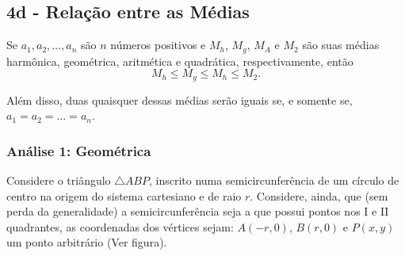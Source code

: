 {\subsection*{4d - Relação entre as Médias}

Se \(a_1, a_2, \ldots, a_n\) são \(n\) números positivos e \(M_h\), \(M_g\), \(M_A\) e \(M_2\) são suas médias harmônica, geométrica, aritmética e quadrática, respectivamente, então
\[M_h \le M_g \le M_h \le M_2.\]

Além disso, duas quaisquer dessas médias serão iguais se, e somente se, \(a_1 = a_2 = \ldots = a_n\).



\subsubsection*{Análise 1: Geométrica}

Considere o triângulo \(\triangle ABP\), inscrito numa semicircunferência de um círculo de centro na origem do sistema cartesiano e de raio \(r\). Considere, ainda, que (sem perda da generalidade) a semicircunferência seja a que possui pontos nos I e II quadrantes, as coordenadas dos vértices sejam: \(A(-r,0)\), \(B(r,0)\) e \(P(x,y)\) um ponto arbitrário (Ver figura).


\begin{center}

{\centering
\SpecialCoor

}
\end{center}}
